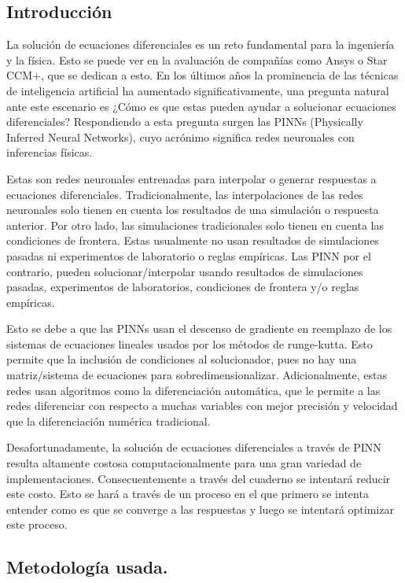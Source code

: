 \documentclass[11pt]{article}
\begin{document}
\hypertarget{introducciuxf3n}{%
\subsection{Introducción}\label{introducciuxf3n}}

La solución de ecuaciones diferenciales es un reto fundamental para la
ingeniería y la física. Esto se puede ver en la avaluación de compañías
como Ansys o Star CCM+, que se dedican a esto. En los últimos años la
prominencia de las técnicas de inteligencia artificial ha aumentado
significativamente, una pregunta natural ante este escenario es ¿Cómo es
que estas pueden ayudar a solucionar ecuaciones diferenciales?
Respondiendo a esta pregunta surgen las PINNs (Physically Inferred
Neural Networks), cuyo acrónimo significa redes neuronales con
inferencias físicas.

Estas son redes neuronales entrenadas para interpolar o generar
respuestas a ecuaciones diferenciales. Tradicionalmente, las
interpolaciones de las redes neuronales solo tienen en cuenta los
resultados de una simulación o respuesta anterior. Por otro lado, las
simulaciones tradicionales solo tienen en cuenta las condiciones de
frontera. Estas usualmente no usan resultados de simulaciones pasadas ni
experimentos de laboratorio o reglas empíricas. Las PINN por el
contrario, pueden solucionar/interpolar usando resultados de
simulaciones pasadas, experimentos de laboratorios, condiciones de
frontera y/o reglas empíricas.

Esto se debe a que las PINNs usan el descenso de gradiente en reemplazo
de los sistemas de ecuaciones lineales usados por los métodos de
runge-kutta. Esto permite que la inclusión de condiciones al
solucionador, pues no hay una matriz/sistema de ecuaciones para
sobredimensionalizar. Adicionalmente, estas redes usan algoritmos como
la diferenciación automática, que le permite a las redes diferenciar con
respecto a muchas variables con mejor precisión y velocidad que la
diferenciación numérica tradicional.

Desafortunadamente, la solución de ecuaciones diferenciales a través de
PINN resulta altamente costosa computacionalmente para una gran variedad
de implementaciones. Consecuentemente a través del cuaderno se intentará
reducir este costo. Esto se hará a través de un proceso en el que
primero se intenta entender como es que se converge a las respuestas y
luego se intentará optimizar este proceso.

\hypertarget{metodologuxeda-usada.}{%
\subsection{Metodología usada.}\label{metodologuxeda-usada.}}
\end{document}
